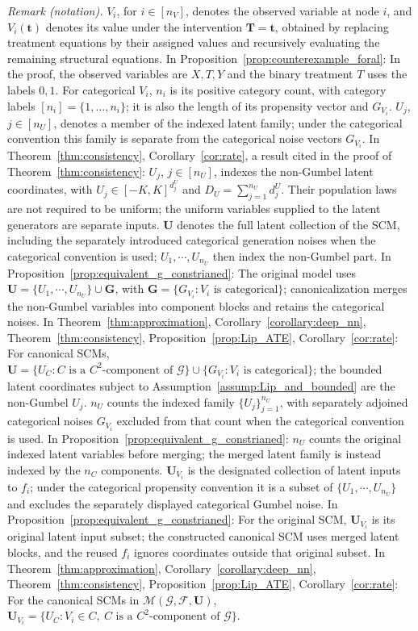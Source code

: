 \documentclass[12pt]{article}
\theoremstyle{plain}
\theoremstyle{definition}
\theoremstyle{remark}
\begin{document}
\noindent\textit{Remark (notation).} $V_i$, for $i\in[n_V]$, denotes the observed variable at node $i$, and $V_i(\boldsymbol{t})$ denotes its value under the intervention $\boldsymbol{T}=\boldsymbol{t}$, obtained by replacing treatment equations by their assigned values and recursively evaluating the remaining structural equations. In Proposition~\ref{prop:counterexample_foral}: In the proof, the observed variables are $X,T,Y$ and the binary treatment $T$ uses the labels $0,1$. For categorical $V_i$, $n_i$ is its positive category count, with category labels $[n_i]=\{1,\ldots,n_i\}$; it is also the length of its propensity vector and $G_{V_i}$. $U_j$, $j\in[n_U]$, denotes a member of the indexed latent family; under the categorical convention this family is separate from the categorical noise vectors $G_{V_i}$. In Theorem~\ref{thm:consistency}, Corollary~\ref{cor:rate}, a result cited in the proof of Theorem~\ref{thm:consistency}: $U_j$, $j\in[n_U]$, indexes the non-Gumbel latent coordinates, with $U_j\in[-K,K]^{d_j^U}$ and $D_U=\sum_{j=1}^{n_U}d_j^U$. Their population laws are not required to be uniform; the uniform variables supplied to the latent generators are separate inputs. $\boldsymbol{U}$ denotes the full latent collection of the SCM, including the separately introduced categorical generation noises when the categorical convention is used; $U_1,\cdots,U_{n_U}$ then index the non-Gumbel part. In Proposition~\ref{prop:equivalent_g_constrianed}: The original model uses $\boldsymbol{U}=\{U_1,\cdots,U_{n_U}\}\cup\boldsymbol{G}$, with $\boldsymbol{G}=\{G_{V_i}:V_i\text{ is categorical}\}$; canonicalization merges the non-Gumbel variables into component blocks and retains the categorical noises. In Theorem~\ref{thm:approximation}, Corollary~\ref{corollary:deep_nn}, Theorem~\ref{thm:consistency}, Proposition~\ref{prop:Lip_ATE}, Corollary~\ref{cor:rate}: For canonical SCMs, $\boldsymbol{U}=\{U_C:C\text{ is a }C^2\text{-component of }\mathcal{G}\}\cup\{G_{V_i}:V_i\text{ is categorical}\}$; the bounded latent coordinates subject to Assumption~\ref{assump:Lip_and_bounded} are the non-Gumbel $U_j$. $n_U$ counts the indexed family $\{U_j\}_{j=1}^{n_U}$, with separately adjoined categorical noises $G_{V_i}$ excluded from that count when the categorical convention is used. In Proposition~\ref{prop:equivalent_g_constrianed}: $n_U$ counts the original indexed latent variables before merging; the merged latent family is instead indexed by the $n_C$ components. $\boldsymbol{U}_{V_i}$ is the designated collection of latent inputs to $f_i$; under the categorical propensity convention it is a subset of $\{U_1,\cdots,U_{n_U}\}$ and excludes the separately displayed categorical Gumbel noise. In Proposition~\ref{prop:equivalent_g_constrianed}: For the original SCM, $\boldsymbol{U}_{V_i}$ is its original latent input subset; the constructed canonical SCM uses merged latent blocks, and the reused $f_i$ ignores coordinates outside that original subset. In Theorem~\ref{thm:approximation}, Corollary~\ref{corollary:deep_nn}, Theorem~\ref{thm:consistency}, Proposition~\ref{prop:Lip_ATE}, Corollary~\ref{cor:rate}: For the canonical SCMs in $\mathcal{M}(\mathcal{G},\mathcal{F},\boldsymbol{U})$, $\boldsymbol{U}_{V_i}=\{U_C:V_i\in C,\ C\text{ is a }C^2\text{-component of }\mathcal{G}\}$. 
\end{document}
